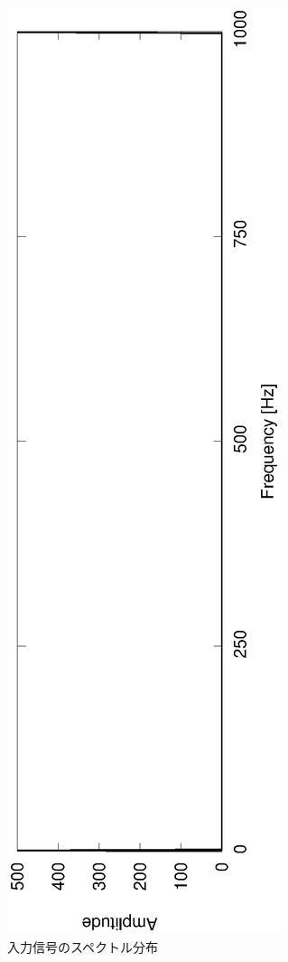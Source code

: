 \documentclass[a4j]{jsarticle}
\begin{document}
\begin{figure}[H]
 \centering
 \vspace{-4cm}
 \hspace{-2cm}
 \includegraphics[angle=-90,scale=0.6]{Input_spec.eps}
  \vspace{-2cm}
 \caption{入力信号のスペクトル分布}
 \label{ins}
\end{figure}
\end{document}
